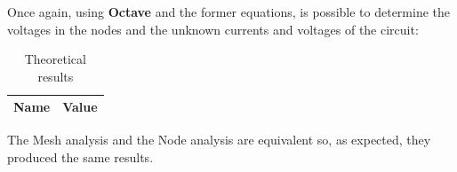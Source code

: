 Once again, using {\bf Octave} and the former equations, is possible to determine the voltages in the nodes and the unknown currents and voltages of the circuit:

\begin{table}[H]
  \centering
  \begin{tabular}{|c|c|}
    \hline
        {\bf Name} & {\bf Value} \\
        \hline
        \hline
        
        \hline
  \end{tabular}
  \caption{Theoretical results}
  \label{node_res}
\end{table} 

The Mesh analysis and the Node analysis are equivalent so, as expected, they produced the same results.


